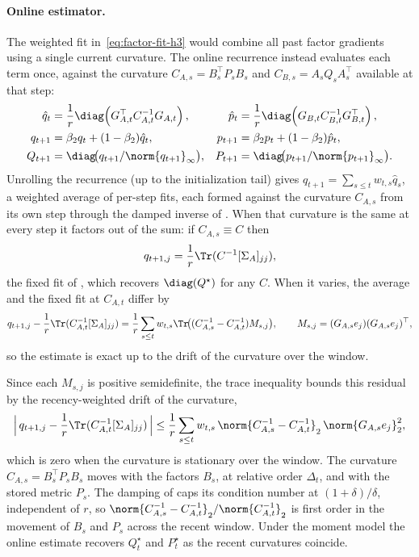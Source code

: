 \paragraph{Online estimator.}
The weighted fit in~\eqref{eq:factor-fit-h3} would combine all past
factor gradients using a single current curvature. The online recurrence
instead evaluates each term once, against the curvature
$C_{A,s}=B_s^\top P_sB_s$ and $C_{B,s}=A_sQ_sA_s^\top$ available at that
step:
\begin{equation}\label{eq:ours-klcoupling-h3}
\begin{aligned}
  \hat{q}_t
    &= \frac1r\diag\!\left(G_{A,t}^\top C_{A,t}^{-1}G_{A,t}\right),
  &
  \hat{p}_t
    &= \frac1r\diag\!\left(G_{B,t}C_{B,t}^{-1}G_{B,t}^\top\right),
  \\
  q_{t+1}
    &= \beta_2q_t+(1-\beta_2)\hat{q}_t,
  &
  p_{t+1}
    &= \beta_2p_t+(1-\beta_2)\hat{p}_t,
  \\
  Q_{t+1}
    &= \diag\!\bigl(q_{t+1}/\norm{q_{t+1}}_\infty\bigr),
  &
  P_{t+1}
    &= \diag\!\bigl(p_{t+1}/\norm{p_{t+1}}_\infty\bigr).
\end{aligned}
\end{equation}
Unrolling the recurrence (up to the initialization tail) gives
$q_{t+1}=\sum_{s\le t}w_{t,s}\hat q_s$, a weighted average of per-step fits,
each formed against the curvature $C_{A,s}$ from its own step through the
damped inverse of . When that curvature is the same at every
step it factors out of the sum: if $C_{A,s}\equiv C$ then
\[
  q_{t+1,j}=\frac1r\Tr(C^{-1}[\Sigma_A]_{jj}),
\]
the fixed fit of , which recovers $\diag(Q^\star)$ for
any $C$. When it varies, the average and the fixed fit at $C_{A,t}$ differ by
\[
  q_{t+1,j}-\frac1r\Tr(C_{A,t}^{-1}[\Sigma_A]_{jj})
  =\frac1r\sum_{s\le t}w_{t,s}\Tr\!\big((C_{A,s}^{-1}-C_{A,t}^{-1})M_{s,j}\big),
  \qquad M_{s,j}=(G_{A,s}e_j)(G_{A,s}e_j)^\top,
\]
so the estimate is exact up to the drift of the curvature over the window.

Since each $M_{s,j}$ is positive semidefinite, the trace inequality bounds this
residual by the recency-weighted drift of the curvature,
\[
  \Big|\,q_{t+1,j}-\frac1r\Tr(C_{A,t}^{-1}[\Sigma_A]_{jj})\,\Big|
  \le
  \frac1r\sum_{s\le t}w_{t,s}\,
  \norm{C_{A,s}^{-1}-C_{A,t}^{-1}}_2\,\norm{G_{A,s}e_j}_2^2 ,
\]
which is zero when the curvature is stationary over the window. The curvature
$C_{A,s}=B_s^\top P_sB_s$ moves with the factors $B_s$, at relative order
$\Delta_t$, and with the stored metric $P_s$. The damping of 
caps its condition number at $(1+\delta)/\delta$, independent of $r$, so
$\norm{C_{A,s}^{-1}-C_{A,t}^{-1}}_2/\norm{C_{A,t}^{-1}}_2$ is first order in the
movement of $B_s$ and $P_s$ across the recent window. Under the moment model
the online estimate recovers $Q^\star_t$ and $P^\star_t$ as the recent
curvatures coincide.

